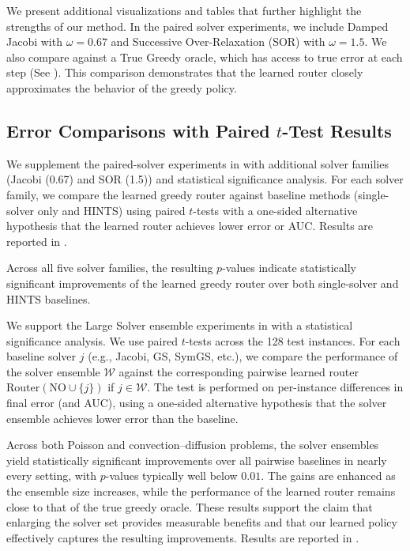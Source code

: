 \documentclass{article}
\begin{document}
We present additional visualizations and tables that further highlight the strengths of our method. In the paired solver experiments, we include Damped Jacobi with $\omega = 0.67$ and Successive Over-Relaxation (SOR) with $\omega = 1.5$. We also compare against a True Greedy oracle, which has access to true error at each step (See ). This comparison demonstrates that the learned router closely approximates the behavior of the greedy policy.

\subsection{Error Comparisons with Paired $t$-Test Results} \label{sec:moreerrorcomparison}

We supplement the paired-solver experiments in  with additional solver families (Jacobi (0.67) and SOR (1.5)) and statistical significance analysis. For each solver family, we compare the learned greedy router against baseline methods (single-solver only and HINTS) using paired $t$-tests with a one-sided alternative hypothesis that the learned router achieves lower error or AUC. Results are reported in .

Across all five solver families, the resulting $p$-values indicate statistically significant improvements of the learned greedy router over both single-solver and HINTS baselines.

We support the Large Solver ensemble experiments in  with a statistical significance analysis. We use paired $t$-tests across the 128 test instances. For each baseline solver $j$ (e.g., Jacobi, GS, SymGS, etc.), we compare the performance of the solver ensemble $\mathcal{W}$ against the corresponding pairwise learned router $\mathrm{Router}(\mathrm{NO}\cup\{j\})$ if $j \in \mathcal{W}$. The test is performed on per-instance differences in final error (and AUC), using a one-sided alternative hypothesis that the solver ensemble achieves lower error than the baseline.

Across both Poisson and convection–diffusion problems, the solver ensembles yield statistically significant improvements over all pairwise baselines in nearly every setting, with $p$-values typically well below $0.01$. The gains are enhanced as the ensemble size increases, while the performance of the learned router remains close to that of the true greedy oracle. These results support the claim that enlarging the solver set provides measurable benefits and that our learned policy effectively captures the resulting improvements. Results are reported in .
\end{document}
